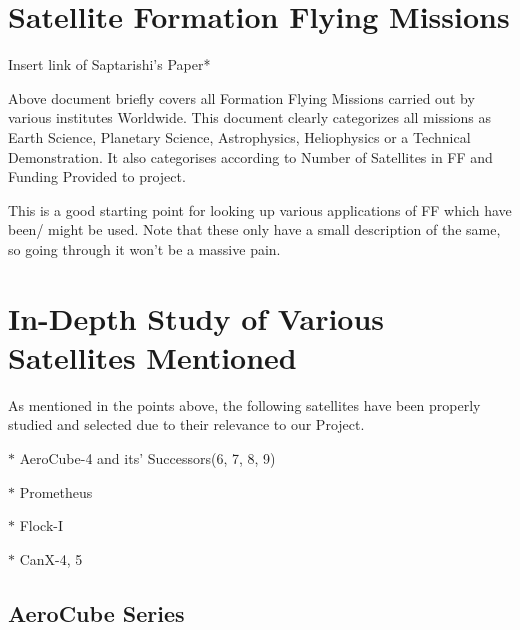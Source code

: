 \documentclass[12pt, a4paper, oneside]{book}
\newenvironment{section-points}{\begin{adjustwidth}{2cm}{2cm}}{\end{adjustwidth}}
\begin{document}
\section{Satellite Formation Flying Missions}
\vspace{0cm}

Insert link of Saptarishi's Paper*

\vspace{0.5cm}

Above document briefly covers all Formation Flying Missions carried out by various institutes Worldwide. This document clearly categorizes all missions as Earth Science, Planetary Science, Astrophysics, Heliophysics or a Technical Demonstration. It also categorises according to Number of Satellites in FF and Funding Provided to project.

\vspace{0.5cm}

This is a good starting point for looking up various applications of FF which have been/ might be used. Note that these only have a small description of the same, so going through it won't be a massive pain.

\clearpage

\section{In-Depth Study of Various Satellites Mentioned}

\vspace{0cm}

As mentioned in the points above, the following satellites have been properly studied and selected due to their relevance to our Project.

\vspace{-0.5cm}

\begin{section-points}
	\item[$\ast$] AeroCube-4 and its' Successors(6, 7, 8, 9)
	\item[$\ast$] Prometheus
	\item[$\ast$] Flock-I
	\item[$\ast$] CanX-4, 5
\end{section-points}

\subsection{AeroCube Series}

\vspace{0cm}
\end{document}
